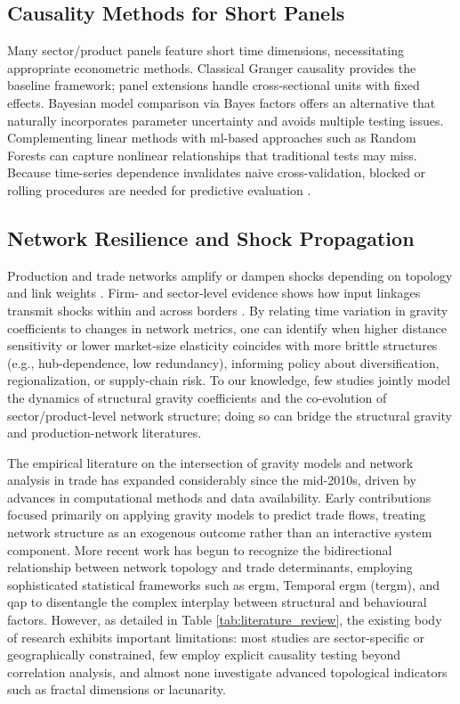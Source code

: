\documentclass[preprint, 3p,
authoryear]{elsarticle} %
\begin{document}
\subsection{Causality Methods for Short Panels}\label{subsec:methods}

Many sector/product panels feature short time dimensions, necessitating
appropriate econometric methods. Classical Granger causality
\citep{granger1969} provides the baseline framework; panel extensions
\citep{dumitrescu2012} handle cross-sectional units with fixed effects.
Bayesian model comparison via Bayes factors \citep{kass1995} offers an
alternative that naturally incorporates parameter uncertainty and avoids
multiple testing issues. Complementing linear methods with
\gls{ml}-based approaches such as Random Forests \citep{breiman2001} can
capture nonlinear relationships that traditional tests may miss. Because
time-series dependence invalidates naive cross-validation, blocked or
rolling procedures are needed for predictive evaluation
\citep{bergmeir2018}.

\subsection{Network Resilience and Shock
Propagation}\label{subsec:resilience}

Production and trade networks amplify or dampen shocks depending on
topology and link weights
\citep{acemoglu2012, carvalho2014, vespignani2012}. Firm- and
sector-level evidence shows how input linkages transmit shocks within
and across borders
\citep{boehm2019, digiovanni2020, carvalho2021, bonadio2021}. By
relating time variation in gravity coefficients to changes in network
metrics, one can identify when higher distance sensitivity or lower
market-size elasticity coincides with more brittle structures (e.g.,
hub-dependence, low redundancy), informing policy about diversification,
regionalization, or supply-chain risk. To our knowledge, few studies
jointly model the dynamics of structural gravity coefficients and the
co-evolution of sector/product-level network structure; doing so can
bridge the structural gravity and production-network literatures.

The empirical literature on the intersection of gravity models and
network analysis in trade has expanded considerably since the mid-2010s,
driven by advances in computational methods and data availability. Early
contributions focused primarily on applying gravity models to predict
trade flows, treating network structure as an exogenous outcome rather
than an interactive system component. More recent work has begun to
recognize the bidirectional relationship between network topology and
trade determinants, employing sophisticated statistical frameworks such
as \gls{ergm}, Temporal \gls{ergm} (\gls{tergm}), and \gls{qap} to
disentangle the complex interplay between structural and behavioural
factors. However, as detailed in Table \ref{tab:literature_review}, the
existing body of research exhibits important limitations: most studies
are sector-specific or geographically constrained, few employ explicit
causality testing beyond correlation analysis, and almost none
investigate advanced topological indicators such as fractal dimensions
or lacunarity.
\end{document}
